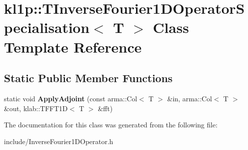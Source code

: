 \hypertarget{classkl1p_1_1TInverseFourier1DOperatorSpecialisation}{}\section{kl1p\+:\+:T\+Inverse\+Fourier1\+D\+Operator\+Specialisation$<$ T $>$ Class Template Reference}
\label{classkl1p_1_1TInverseFourier1DOperatorSpecialisation}
\subsection*{Static Public Member Functions}
\begin{DoxyCompactItemize}
\item 
static void {\bfseries Apply\+Adjoint} (const arma\+::\+Col$<$ T $>$ \&in, arma\+::\+Col$<$ T $>$ \&out, klab\+::\+T\+F\+F\+T1D$<$ T $>$ \&fft)\hypertarget{classkl1p_1_1TInverseFourier1DOperatorSpecialisation_aa9dea9b7f88a1f6a51f485d778de0544}{}\label{classkl1p_1_1TInverseFourier1DOperatorSpecialisation_aa9dea9b7f88a1f6a51f485d778de0544}

\end{DoxyCompactItemize}


The documentation for this class was generated from the following file\+:\begin{DoxyCompactItemize}
\item 
include/Inverse\+Fourier1\+D\+Operator.\+h\end{DoxyCompactItemize}
